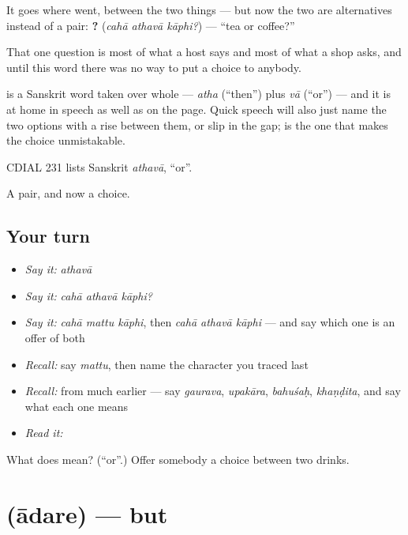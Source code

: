 It goes where  went, between the two things — but now the two are alternatives instead of a pair: \textbf{  ?} (\emph{cahā athavā kāphi?}) — \textquotedblleft{}tea or coffee?\textquotedblright{}

That one question is most of what a host says and most of what a shop asks, and until this word there was no way to put a choice to anybody.

 is a Sanskrit word taken over whole — \emph{atha} (\textquotedblleft{}then\textquotedblright{}) plus \emph{vā} (\textquotedblleft{}or\textquotedblright{}) — and it is at home in speech as well as on the page. Quick speech will also just name the two options with a rise between them, or slip  in the gap;  is the one that makes the choice unmistakable.

CDIAL 231 lists Sanskrit \emph{athavā}, \textquotedblleft{}or\textquotedblright{}.

\begin{grammarlens}[title={What you've built}]
A pair, and now a choice.
\end{grammarlens}

\subsection*{Your turn}
\begin{itemize}
\raggedright
  \item \emph{Say it:} \emph{athavā}
  \item \emph{Say it:} \emph{cahā athavā kāphi?}
  \item \emph{Say it:} \emph{cahā mattu kāphi}, then \emph{cahā athavā kāphi} — and say which one is an offer of both
  \item \emph{Recall:} say \emph{mattu}, then name the character you traced last
  \item \emph{Recall:} from much earlier — say \emph{gaurava}, \emph{upakāra}, \emph{bahuśaḥ}, \emph{khaṇḍita}, and say what each one means
  \item \emph{Read it:} \textbf{}
\end{itemize}

\begin{tcolorbox}[breakable,colback=teal!4,colframe=teal!35!black,title={Before you move on}]
What does  mean? (\textquotedblleft{}or\textquotedblright{}.) Offer somebody a choice between two drinks.
\end{tcolorbox}
\section[\texorpdfstring{\kn{ಆದರೆ} (ādare)}{ಆದರೆ (ādare)}]{ (ādare) — but}

